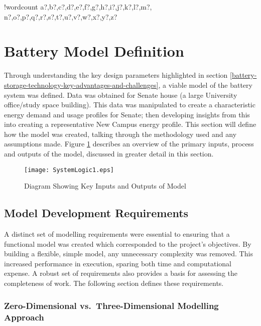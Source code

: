 \documentclass[fontsize=9.5pt]{extarticle}
\numberwithin{figure}{section} %
\newcounter{words}
\newenvironment{counted}{%
  \setcounter{words}{0}
  \SearchList!{wordcount}{\stepcounter{words}}
    {a?,b?,c?,d?,e?,f?,g?,h?,i?,j?,k?,l?,m?,
    n?,o?,p?,q?,r?,s?,t?,u?,v?,w?,x?,y?,z?}
  \UndoBoundary{'}
  \SearchOrder{p;}}{%
  \StopSearching}
\begin{document}
\begin{counted}
\section{Battery Model Definition}\label{battery-model-definition}

Through understanding the key design parameters highlighted in section
\ref{battery-storage-technology-key-advantages-and-challenges}, a viable
model of the battery system was defined. Data was obtained for Senate
house (a large University office/study space building). This data was
manipulated to create a characteristic energy demand and usage profiles
for Senate; then developing insights from this into creating a
representative New Campus energy profile. This section will define how
the model was created, talking through the methodology used and any
assumptions made. Figure \ref{SystemLogic1} describes an overview of the
primary inputs, process and outputs of the model, discussed in greater
detail in this section.

\begin{figure}[H]
 \centering
 \texttt{[image: SystemLogic1.eps]}
 \caption{Diagram Showing Key Inputs and Outputs of Model}
 \label{SystemLogic1}
 \end{figure}

\subsection{Model Development
Requirements}\label{model-development-requirements}

A distinct set of modelling requirements were essential to ensuring that
a functional model was created which corresponded to the project's
objectives. By building a flexible, simple model, any unnecessary
complexity was removed. This increased performance in execution, sparing
both time and computational expense. A robust set of requirements also
provides a basis for assessing the completeness of work. The following
section defines these requirements.

\subsubsection{Zero-Dimensional vs.~Three-Dimensional Modelling
Approach}\label{zero-dimensional-vs.three-dimensional-modelling-approach}


\end{counted}
\end{document}
